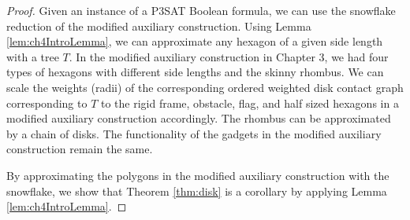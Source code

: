 \documentclass[10pt]{CSUNthesis}
\theoremstyle{plain}%
\theoremstyle{definition}
\theoremstyle{remark}
\begin{document}
\begin{proof}
Given an instance of a P3SAT Boolean formula, we can use the snowflake reduction of the modified auxiliary construction.  
Using Lemma \ref{lem:ch4IntroLemma}, we can approximate any hexagon of a given side length with a tree $T$.  
In the modified auxiliary construction in Chapter 3, we had four types of hexagons with different side lengths and the skinny rhombus.  
We can scale the weights (radii) of the corresponding ordered weighted disk contact graph corresponding to $T$ to the rigid frame, obstacle, flag, and half sized hexagons in a modified auxiliary construction accordingly.  
The rhombus can be approximated by a chain of disks.  
The functionality of the gadgets in the modified auxiliary construction remain the same.

By approximating the polygons in the modified auxiliary construction with the snowflake, we show that Theorem \ref{thm:disk} is a corollary by applying Lemma \ref{lem:ch4IntroLemma}.  
\end{proof}



\end{document}
